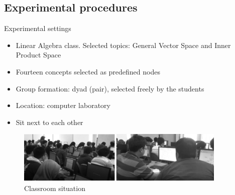 \subsection{Experimental procedures}

\begin{frame}{Experimental settings}
\begin{itemize}
    \item Linear Algebra class. Selected topics: General Vector Space and Inner Product Space
    \item Fourteen concepts selected as predefined nodes
    \item Group formation: dyad (pair), selected freely by the students
    \item Location: computer laboratory
    \item Sit next to each other
\end{itemize}

\begin{figure}[tb]
        \begin{center}
            \includegraphics[width=100mm]{images/classroom_situation.pdf}
        \end{center}
        \caption{Classroom situation}
        \label{intro::rkb_p4}
    \end{figure}

\end{frame}

